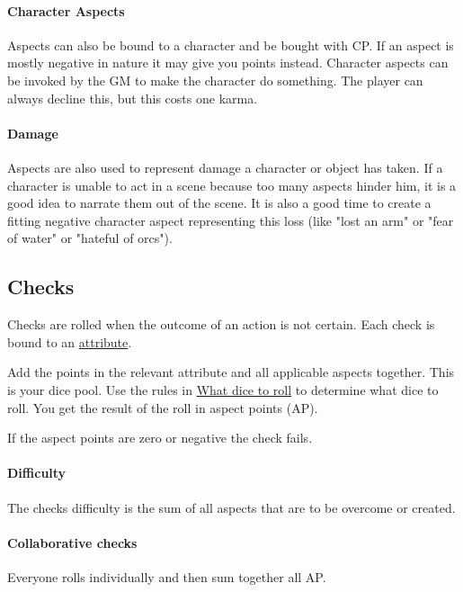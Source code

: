 \documentclass[11pt]{article}
\begin{document}
{\paragraph*{Character Aspects}
\label{sec:orgff89a2b}

Aspects can also be bound to a character and be bought with CP. If an aspect is mostly negative in nature it may give you points instead. Character aspects can be invoked by the GM to make the character do something. The player can always decline this, but this costs one karma.

\paragraph*{Damage}
\label{sec:orga70536f}

Aspects are also used to represent damage a character or object has taken. If a character is unable to act in a scene because too many aspects hinder him, it is a good idea to narrate them out of the scene. It is also a good time to create a fitting negative character aspect representing this loss (like "lost an arm" or "fear of water" or "hateful of orcs").

\subsection{Checks}
\label{sec:orgdb9101c}
Checks are rolled when the outcome of an action is not certain. Each check is bound to an \hyperref[sec:org971eef4]{attribute}.

Add the points in the relevant attribute and all applicable aspects together. This is your dice pool. Use the rules in \hyperref[sec:org6f8610d]{What dice to roll} to determine what dice to roll. You get the result of the roll in aspect points (AP).

If the aspect points are zero or negative the check fails.

\paragraph*{Difficulty}
\label{sec:org5136bdf}
The checks difficulty is the sum of all aspects that are to be overcome or created.


\paragraph*{Collaborative checks}
\label{sec:org53b03dc}
Everyone rolls individually and then sum together all AP.

}
\end{document}
